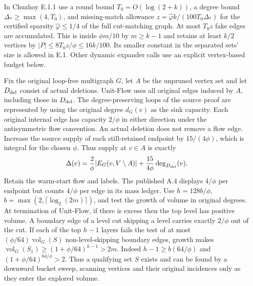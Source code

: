 \documentclass[11pt]{article}
\begin{document}
\begin{itemize}
  In Chuzhoy E.1.1 use a round bound \(T_0=O(\log(2+k))\), a degree bound \(\Delta_*\ge\max(4,T_0)\), and missing-match allowance \(z=\widehat\varphi k/(100T_0\Delta_*)\) for the certified sparsity \(\widehat\varphi\le1/4\) of the full cut-matching graph. At most \(T_0z\) fake edges are accumulated. This is inside \(\phi m/10\) by \(m\ge k-1\) and retains at least \(k/2\) vertices by \(|P|\le 8T_0z/\phi\le 16k/100\). Its smaller constant in the separated sets' size is allowed in E.1. Other dynamic expander calls use an explicit vertex-based budget below.

  Fix the original loop-free multigraph \(G\), let \(A\) be the unpruned vertex set and let \(D_{\rm del}\) consist of actual deletions. Unit-Flow uses all original edges induced by \(A\), including those in \(D_{\rm del}\). The degree-preserving loops of the source proof are represented by using the original degree \(d_G(v)\) as the sink capacity. Each original internal edge has capacity \(2/\phi\) in either direction under the antisymmetric flow convention. An actual deletion does not remove a flow edge. Increase the source supply of each still-retained endpoint by \(15/(4\phi)\), which is integral for the chosen \(\phi\). Thus supply at \(v\in A\) is exactly
  \[
  \Delta(v)=\frac{2}{\phi}|E_G(v,V\setminus A)|+\frac{15}{4\phi}\deg_{D_{\rm del}}(v).
  \]
  Retain the warm-start flow and labels. The published A.4 displays \(4/\phi\) per endpoint but counts \(4/\phi\) per edge in its mass ledger. Use \(h=128b/\phi\), \(b=\max(2,\lceil\log_2(2m)\rceil)\), and test the growth of volume in original degrees. At termination of Unit-Flow, if there is excess then the top level has positive volume. A boundary edge of a level cut skipping a level carries exactly \(2/\phi\) out of the cut. If each of the top \(h-1\) layers fails the test of at most \((\phi/64)\operatorname{vol}_G(S)\) non-level-skipping boundary edges, growth makes \(\operatorname{vol}_G(S_1)\ge(1+\phi/64)^{h-1}>2m\). Indeed \(h-1\ge b(64/\phi)\) and \((1+\phi/64)^{64/\phi}>2\). Thus a qualifying set \(S\) exists and can be found by a downward bucket sweep, scanning vertices and their original incidences only as they enter the explored volume.


\end{itemize}
\end{document}
